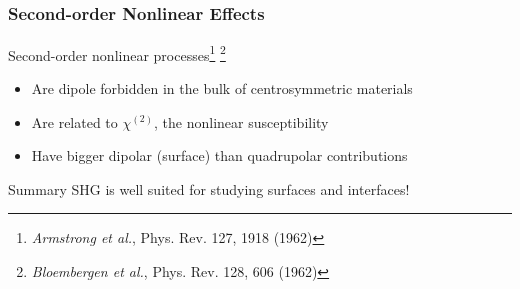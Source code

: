 \documentclass{beamer}
\begin{document}

\subsection{}

\begin{frame}
\frametitle{Second-order Nonlinear Effects}
Second-order nonlinear processes\footnote{\emph{Armstrong et al.}, Phys. Rev.
127, 1918 (1962)}
\footnote{\emph{Bloembergen et al.}, Phys. Rev. 128, 606 (1962)}
\begin{itemize}
\item Are dipole forbidden in the bulk of centrosymmetric materials
\item Are related to $\chi^{(2)}$, the nonlinear susceptibility
\item Have bigger dipolar (surface) than quadrupolar contributions
\end{itemize}\vfill
\begin{block}{Summary}
SHG is well suited for studying surfaces and interfaces!
\end{block}
\end{frame}
\end{document}

